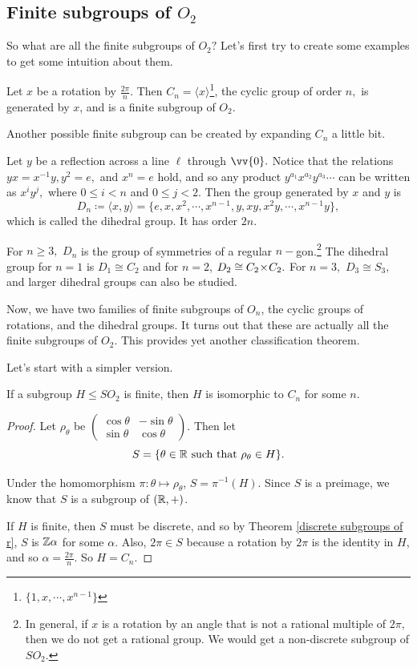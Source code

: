 \subsection{Finite subgroups of \texorpdfstring{$O_2$}{O2}}
So what are all the finite subgroups of $O_2?$ 
Let's first try to create some examples to get some intuition about them.
\begin{example}
Let $x$ be a rotation by $\frac{2\pi}{n}.$ Then $C_n = \langle x \rangle$\footnote{$\{1, x, \cdots, x^{n-1}\}$}, the cyclic group of order $n,$ is generated by $x$, and is a finite subgroup of $O_2.$ 
\end{example}

Another possible finite subgroup can be created by expanding $C_n$ a little bit. 
\begin{example}
Let $y$ be a reflection across a line $\ell$ through $\vv{0}.$ Notice that the relations $yx = x^{-1}y, y^2 = e,$ and $x^n = e$ hold, and so any product  $y^{a_1}x^{a_2}y^{a_3}\cdots$ can be written as $x^{i}y^{j},$ where $0 \leq i < n$ and $0 \leq j < 2.$ Then the group generated by $x$ and $y$ is 
\[
D_n \coloneqq \langle x, y \rangle = \{e, x, x^2, \cdots, x^{n-1}, y, xy, x^2y, \cdots, x^{n-1}y\},
\]
which is called the dihedral group. It has order $2n.$
\end{example}

For $n \geq 3,$ $D_n$ is the group of symmetries of a regular $n-$gon.\footnote{In general, if $x$ is a rotation by an angle that is not a rational multiple of $2\pi,$ then we do not get a rational group. We would get a non-discrete subgroup of $SO_2.$} The dihedral group for $n= 1$ is $D_1 \cong C_2$ and for $n = 2$, $D_2 \cong C_2 \hspace{0.05em}{\times}\hspace{0.05em} C_2.$ For $n=3,$ $D_3 \cong S_3,$ and larger dihedral groups can also be studied. 

Now, we have two families of finite subgroups of $O_n$, the cyclic groups of rotations, and the dihedral groups. It turns out that these are actually all the finite subgroups of $O_2$. This provides yet another classification theorem.

Let's start with a simpler version. 
\begin{theorem}
If a subgroup $H \leq SO_2$ is finite, then $H$ is isomorphic to $C_n$ for some $n.$
\end{theorem}
\begin{proof}
Let $\rho_{\theta}$ be $\begin{pmatrix}
\cos\theta & -\sin\theta \\
\sin\theta & \cos\theta
\end{pmatrix}$. Then let
\[
S = \{\theta \in \mathbb R \text{ such that } \rho_{\theta} \in H\}.
\]

Under the homomorphism $\pi: \theta \mapsto \rho_{\theta}$, $S = \pi^{-1}(H).$ Since $S$ is a preimage, we know that $S$ is a subgroup of $(\mathbb R, +)$.

If $H$ is finite, then $S$ must be discrete, and so by Theorem \ref{discrete subgroups of r}, $S$ is $\mathbb Z \alpha$ for some $\alpha.$ Also, $2\pi \in S$ because a rotation by $2\pi$ is the identity in $H$, and so $\alpha = \frac{2\pi}{n}$. So $\boxed{H= C_n.}$ 
\end{proof}

